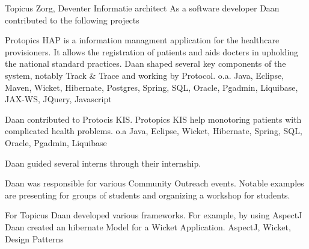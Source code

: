	\begin{workExperience}{Topicus Zorg, Deventer}%
	{Informatie architect}{}
                As a software developer Daan contributed to the
                following projects

                Protopics HAP is a information managment application
                for the healthcare provisioners. It allows the
                registration of patients and aids docters in upholding
                the national standard practices.
                Daan shaped several key components of the system,
                notably Track \& Trace and working by Protocol.
		\technics o.a. Java, Eclipse, Maven, Wicket, Hibernate, Postgres,
		Spring, SQL, Oracle, Pgadmin, Liquibase, JAX-WS, JQuery, Javascript
		
                Daan contributed to Protocis KIS. Protopics KIS help
                monotoring patients with complicated health problems.
		\technics o.a Java, Eclipse, Wicket, Hibernate, Spring, SQL, Oracle,
		Pgadmin, Liquibase
		
                Daan guided several interns through their internship.
		
                Daan was responsible for various Community Outreach
                events. Notable examples are presenting for groups of
                students and organizing a workshop for students.
		
                For Topicus Daan developed various frameworks. For
                example, by using AspectJ Daan created an hibernate
                Model for a Wicket Application.
		\technics AspectJ, Wicket, Design Patterns
	\end{workExperience}

